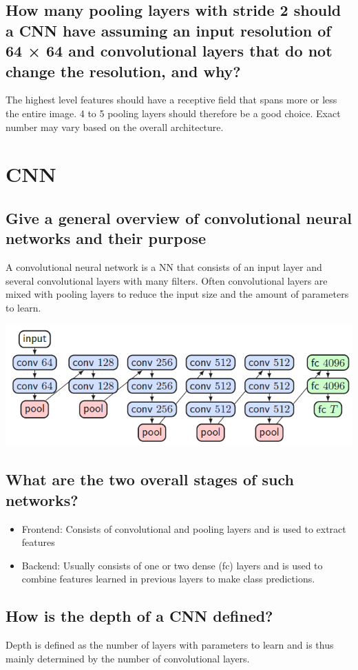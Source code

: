 \subsection{How many pooling layers with stride 2 should a CNN have assuming an input resolution of 64 × 64 and convolutional layers that do not change the resolution, and why?}
The highest level features should have a receptive field that spans more or less the entire image. 4 to 5 pooling layers should therefore be a good choice. Exact number may vary based on the overall architecture.
%
\section{CNN}
\subsection{Give a general overview of convolutional neural networks and their purpose}
A convolutional neural network is a NN that consists of an input layer and several convolutional layers with many filters. Often convolutional layers are mixed with pooling layers to reduce the input size and the amount of parameters to learn. 

\includegraphics[width=\textwidth]{./img/cnn.PNG}
\subsection{What are the two overall stages of such networks?}
\begin{itemize}
\item Frontend: Consists of convolutional and pooling layers and is used to extract features
\item Backend: Usually consists of one or two dense (fc) layers and is used to combine features learned in previous layers to make class predictions. 
\end{itemize}
\subsection{How is the depth of a CNN defined?}
Depth is defined as the number of layers with parameters to learn and is thus mainly determined by the number of convolutional layers.
